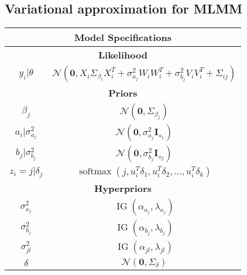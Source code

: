 \documentclass[11pt]{article}
\newcommand{\bs}{\boldsymbol}
\newcommand{\opn}{\operatorname}
\begin{document}
\subsection{Variational approximation for MLMM}
\begin{table}[!htbp]
\centering
  \begin{tabular}{*2c}
    \toprule
    \multicolumn{2}{c}{\textbf{Model Specifications}}\\
    \toprule
    \multicolumn{2}{c}{\textbf{Likelihood}}\\
    \midrule
    $y_{i}|\theta $ & $\mathcal{N}\left(\bs{0}, X_{i}\Sigma_{\beta_{i}}X_{i}^{T} + \sigma_{a_{j}}^{2}W_{i}W_{i}^{T} + \sigma_{b_{j}}^{2}V_{i}V_{i}^{T}+\Sigma_{ij} \right)$\\
    \toprule
    \multicolumn{2}{c}{\textbf{Priors}}\\
    \midrule
    $\beta_{j}$ & $\mathcal{N}\left(\bs{0}, \Sigma_{\beta_{j}} \right)$\\
    \midrule
    $a_{i}|\sigma_{a_{j}}^{2} $ & $\mathcal{N}\left(\bs{0}, \sigma_{a_{j}}^{2}\bs{I}_{s_{1}} \right)$\\
    \midrule
    $b_{j}|\sigma_{b_{j}}^{2} $ & $\mathcal{N}\left(\bs{0}, \sigma_{b_{j}}^{2}\bs{I}_{s_{2}} \right)$\\
    \midrule
    $z_{i}=j|\delta_{j}$ & $\opn{softmax}\left(j, u_{i}^{T}\delta_{1}, u_{i}^{T}\delta_{2}, \ldots, u_{i}^{T}\delta_{k} \right) $\\
    \toprule
    \multicolumn{2}{c}{\textbf{Hyperpriors}}\\
    \midrule
    $\sigma_{a_{j}}^{2}$ & $\opn{IG}\left(\alpha_{a_{j}}, \lambda_{a_{j}} \right)$\\
    \midrule
    $\sigma_{b_{j}}^{2}$ & $\opn{IG}\left(\alpha_{b_{j}}, \lambda_{b_{j}} \right)$\\
    \midrule
    $\sigma_{jl}^{2}$ & $\opn{IG}\left(\alpha_{jl}, \lambda_{jl} \right)$\\
    \midrule
    $\delta$ & $\mathcal{N}\left(\bs{0}, \Sigma_{\delta} \right) $\\
    \bottomrule
  \end{tabular}
\end{table}
\end{document}
